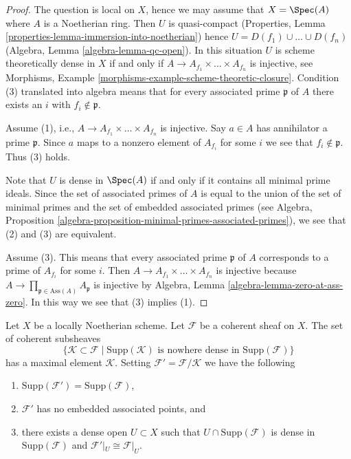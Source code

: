 \begin{proof}
The question is local on $X$, hence we may assume that $X = \Spec(A)$
where $A$ is a Noetherian ring. Then $U$ is quasi-compact
(Properties, Lemma \ref{properties-lemma-immersion-into-noetherian})
hence $U = D(f_1) \cup \ldots \cup D(f_n)$
(Algebra, Lemma \ref{algebra-lemma-qc-open}).
In this situation $U$ is scheme theoretically dense in $X$ if and only if
$A \to A_{f_1} \times \ldots \times A_{f_n}$ is injective, see
Morphisms, Example \ref{morphisms-example-scheme-theoretic-closure}.
Condition (3) translated into algebra means that for every associated
prime $\mathfrak p$ of $A$ there exists an $i$ with $f_i \not \in \mathfrak p$.

\medskip\noindent
Assume (1), i.e., $A \to A_{f_1} \times \ldots \times A_{f_n}$ is injective.
Say $a \in A$ has annihilator a prime $\mathfrak p$. Since $a$ maps
to a nonzero element of $A_{f_i}$ for some $i$ we see that
$f_i \not \in \mathfrak p$. Thus (3) holds.

\medskip\noindent
Note that $U$ is dense in $\Spec(A)$ if and only if it contains all
minimal prime ideals. Since the set of associated primes
of $A$ is equal to the union of the set of minimal primes and the
set of embedded associated primes (see Algebra, Proposition
\ref{algebra-proposition-minimal-primes-associated-primes}),
we see that (2) and (3) are equivalent.

\medskip\noindent
Assume (3). This means that every associated prime $\mathfrak p$ of $A$
corresponds to a prime of $A_{f_i}$ for some $i$. Then
$A \to A_{f_1} \times \ldots \times A_{f_n}$ is injective because
$A \to \prod_{\mathfrak p \in \text{Ass}(A)} A_\mathfrak p$ is injective
by Algebra, Lemma \ref{algebra-lemma-zero-at-ass-zero}. In this way
we see that (3) implies (1).
\end{proof}

\begin{lemma}
\label{lemma-remove-embedded-points}
Let $X$ be a locally Noetherian scheme.
Let $\mathcal{F}$ be a coherent sheaf on $X$.
The set of coherent subsheaves
$$
\{
\mathcal{K} \subset \mathcal{F}
\mid
\text{Supp}(\mathcal{K})\text{ is nowhere dense in }\text{Supp}(\mathcal{F})
\}
$$
has a maximal element $\mathcal{K}$.
Setting $\mathcal{F}' = \mathcal{F}/\mathcal{K}$ we have the
following
\begin{enumerate}
\item $\text{Supp}(\mathcal{F}') = \text{Supp}(\mathcal{F})$,
\item $\mathcal{F}'$ has no embedded associated points, and
\item there exists a dense open $U \subset X$ such that
$U \cap \text{Supp}(\mathcal{F})$ is dense in $\text{Supp}(\mathcal{F})$
and $\mathcal{F}'|_U \cong \mathcal{F}|_U$.
\end{enumerate}
\end{lemma}

